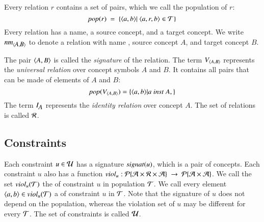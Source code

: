 \documentclass{elsarticle}
\begin{document}
	Every relation $r$ contains a set of pairs, which we call the population of $r$:
\begin{equation}
	\pop{r}\ =\ \{ \pair{a}{b}|\ \triple{a}{r}{b}\in\triples\}
\end{equation}
	Every relation has a name, a source concept, and a target concept.
	We write $\text{\it nm\/}_{\langle{\text{\it \small A\/}},{\text{\it \small B\/}}\rangle}$ to denote a relation with name , source concept $A$, and target concept $B$.

	The pair $\langle{A},{B}\rangle$ is called the \emph{signature} of the relation.
	The term $V_{\langle{A},{B}\rangle}$ represents the \emph{universal relation} over concept symbols $A$ and $B$.
	It contains all pairs that can be made of elements of $A$ and $B$:
\[\pop{\fullt{A}{B}} = \{ \pair{a}{b}| a\ \inst\ A, \}\]
	The term $I_{\text{\it \small A\/}}$ represents the \emph{identity relation} over concept $A$.
	The set of relations is called $\mathcal{R}$.

	
\subsection{Constraints}
	Each constraint $u\in\mathcal{U}$ has a signature $\text{\it signat\/}(u)$, which is a pair of concepts.
	Each constraint $u$ also has a function $\id{viol}_u:\powerset{\atoms\times\rels\times\atoms}\ \rightarrow\ \powerset{\atoms\times\atoms}$.
	We call the set $\text{\it viol\/}_{u}(\mathcal{T})$ the  of constraint $u$ in population $\mathcal{T}$.
	We call every element $\langle{a},{b}\rangle\in\text{\it viol\/}_{u}(\mathcal{T})$ a  of constraint $u$ in $\mathcal{T}$.
	Note that the signature of $u$ does not depend on the population, whereas the violation set of $u$ may be different for every $\mathcal{T}$.
	The set of constraints is called $\mathcal{U}$.
\end{document}

